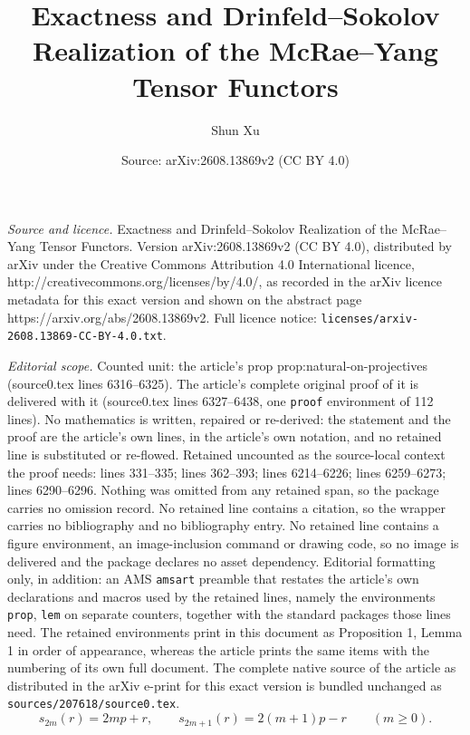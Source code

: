 \documentclass[10pt,a4paper]{amsart}
\title{Exactness and Drinfeld--Sokolov Realization of the McRae--Yang Tensor Functors}
\author{Shun Xu}
\date{Source: arXiv:2608.13869v2 (CC BY 4.0)}
\begin{document}
\maketitle

\noindent\emph{Source and licence.} Exactness and Drinfeld--Sokolov Realization of the McRae--Yang Tensor Functors. Version arXiv:2608.13869v2 (CC BY 4.0), distributed by arXiv under the Creative Commons Attribution 4.0 International licence, http://creativecommons.org/licenses/by/4.0/, as recorded in the arXiv licence metadata for this exact version and shown on the abstract page https://arxiv.org/abs/2608.13869v2. Full licence notice: \texttt{licenses/arxiv-2608.13869-CC-BY-4.0.txt}.\par\smallskip

\noindent\textit{Editorial scope.} Counted unit: the article's prop prop:natural-on-projectives (source0.tex lines 6316--6325). The article's complete original proof of it is delivered with it (source0.tex lines 6327--6438, one \texttt{proof} environment of 112 lines). No mathematics is written, repaired or re-derived: the statement and the proof are the article's own lines, in the article's own notation, and no retained line is substituted or re-flowed.  Retained uncounted as the source-local context the proof needs: lines 331--335; lines 362--393; lines 6214--6226; lines 6259--6273; lines 6290--6296.  Nothing was omitted from any retained span, so the package carries no omission record.  No retained line contains a citation, so the wrapper carries no bibliography and no bibliography entry.  No retained line contains a figure environment, an image-inclusion command or drawing code, so no image is delivered and the package declares no asset dependency.  Editorial formatting only, in addition: an AMS \texttt{amsart} preamble that restates the article's own declarations and macros used by the retained lines, namely the environments \texttt{prop}, \texttt{lem} on separate counters, together with the standard packages those lines need.  The retained environments print in this document as Proposition 1, Lemma 1 in order of appearance, whereas the article prints the same items with the numbering of its own full document.  The complete native source of the article as distributed in the arXiv e-print for this exact version is bundled unchanged as \texttt{sources/207618/source0.tex}.
\begin{equation}\label{eq:reflection-chain}
 s_{2m}(r)=2mp+r,\qquad
 s_{2m+1}(r)=2(m+1)p-r
 \qquad(m\geq0).
\end{equation}
\end{document}

